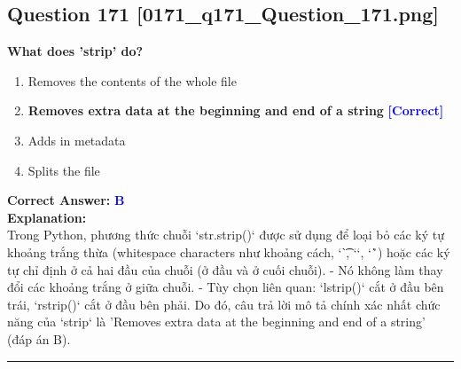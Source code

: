 \documentclass[11pt,a4paper]{article}
\begin{document}
\begin{minipage}{\textwidth}
\subsection*{Question 171 \quad \footnotesize{[0171_q171_Question_171.png]}}
\noindent \textbf{What does 'strip' do?}

\begin{enumerate}[label=\Alph*.]
    \item Removes the contents of the whole file
    \item \textbf{Removes extra data at the beginning and end of a string} \hfill \textcolor{blue}{\textbf{[Correct]}}
    \item Adds in metadata
    \item Splits the file
\end{enumerate}

\noindent \textbf{Correct Answer:} \textcolor{blue}{\textbf{B}} \\[4pt]
\noindent \textbf{Explanation:}\\
Trong Python, phương thức chuỗi `str.strip()` được sử dụng để loại bỏ các ký tự khoảng trắng thừa (whitespace characters như khoảng cách, `\t`, `\n`, `\r`) hoặc các ký tự chỉ định ở cả hai đầu của chuỗi (ở đầu và ở cuối chuỗi).\newline
- Nó không làm thay đổi các khoảng trắng ở giữa chuỗi.\newline
- Tùy chọn liên quan: `lstrip()` cắt ở đầu bên trái, `rstrip()` cắt ở đầu bên phải.\newline
Do đó, câu trả lời mô tả chính xác nhất chức năng của `strip` là 'Removes extra data at the beginning and end of a string' (đáp án B).
\end{minipage}
\vspace{0.8cm}
\hrule
\vspace{0.5cm}
\end{document}
